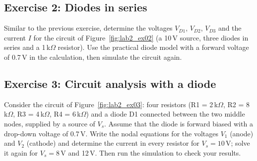 
\subsection{Exercise 2: Diodes in series}
Similar to the previous exercise, determine the voltages $V_{D1}$, $V_{D2}$, $V_{D3}$ and the current $I$ for the circuit of Figure~\ref{fig:lab2_ex02} (a 10\,V source, three diodes in series and a 1\,k$\Omega$ resistor). Use the practical diode model with a forward voltage of 0.7\,V in the calculation, then simulate the circuit again.






\subsection{Exercise 3: Circuit analysis with a diode}
Consider the circuit of Figure~\ref{fig:lab2_ex03}: four resistors (R1 = 2\,k$\Omega$, R2 = 8\,k$\Omega$, R3 = 4\,k$\Omega$, R4 = 6\,k$\Omega$) and a diode D1 connected between the two middle nodes, supplied by a source of $V_s$. Assume that the diode is forward biased with a drop-down voltage of 0.7\,V. Write the nodal equations for the voltages $V_1$ (anode) and $V_2$ (cathode) and determine the current in every resistor for $V_s=10$\,V; solve it again for $V_s=8$\,V and 12\,V. Then run the simulation to check your results.

